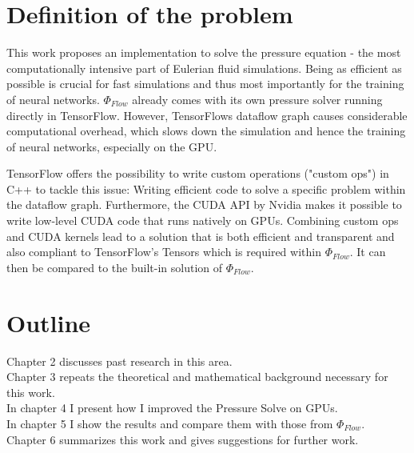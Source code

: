 \section{Definition of the problem}
This work proposes an implementation to solve the pressure equation - the most computationally intensive part of Eulerian fluid simulations. Being as efficient as possible is crucial for fast simulations and thus most importantly for the training of neural networks. $\Phi_\textit{Flow}$ already comes with its own pressure solver running directly in TensorFlow. However, TensorFlows dataflow graph causes considerable computational overhead, which slows down the simulation and hence the training of neural networks, especially on the GPU. 
\par TensorFlow offers the possibility to write custom operations ("custom ops") in C++ to tackle this issue: Writing efficient code to solve a specific problem within the dataflow graph. Furthermore, the CUDA API by Nvidia makes it possible to write low-level CUDA code that runs natively on GPUs. Combining custom ops and CUDA kernels lead to a solution that is both efficient and transparent and also compliant to TensorFlow's Tensors which is required within $\Phi_\textit{Flow}$. It can then be compared to the built-in solution of $\Phi_\textit{Flow}$.
\section{Outline}
Chapter 2 discusses past research in this area.\\
Chapter 3 repeats the theoretical and mathematical background necessary for this work.\\
In chapter 4 I present how I improved the Pressure Solve on GPUs.\\
In chapter 5 I show the results and compare them with those from $\Phi_\textit{Flow}$.\\
Chapter 6 summarizes this work and gives suggestions for further work.\\

